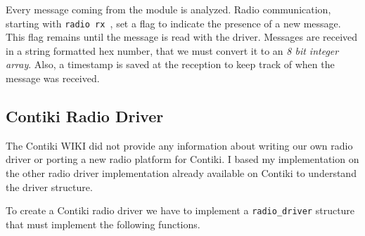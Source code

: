 Every message coming from the module is analyzed.
Radio communication, starting with \lstinline{radio rx }, set a flag to indicate the 
presence of a new message. 
This flag remains until the message is read with the driver.
Messages are received in a string formatted hex number, that we must convert it to an
\emph{8 bit integer array}. 
Also, a timestamp is saved at the reception to keep track of when the
message was received.



\subsection{Contiki Radio Driver}

The Contiki WIKI did not provide any information about writing our own radio driver
or porting a new radio platform for Contiki.
I based my implementation on the other radio driver implementation already
available on Contiki to understand the driver structure.

To create a Contiki radio driver we have to implement a \lstinline{radio_driver}
structure that must implement the following functions.

